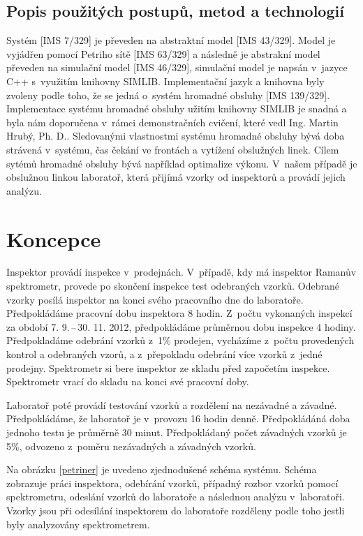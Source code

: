 \documentclass[11pt,a4paper]{article}
\begin{document}
\subsection{Popis použitých postupů, metod a technologií}
Systém [IMS 7/329] je převeden na abstraktní model [IMS 43/329].
Model je vyjádřen pomocí Petriho sítě [IMS 63/329] a následně
je abstrakní model převeden na simulační model [IMS 46/329],
simulační model je napsán v~jazyce C++ s~využitím
knihovny SIMLIB. Implementační jazyk a knihovna byly zvoleny podle
toho, že se jedná o~systém hromadné obsluhy [IMS 139/329]. Implementace
systému hromadné obsluhy užitím knihovny SIMLIB je snadná a byla nám doporučena v~rámci
demonstračních cvičení, které vedl Ing. Martin Hrubý, Ph. D..
Sledovanými vlastnostmi systému hromadné obsluhy bývá doba strávená v~systému, čas čekání ve frontách a 
vytížení obslužných linek. Cílem sytémů hromadné obsluhy bývá například optimalize výkonu. V~našem případě je 
obslužnou linkou laboratoř, která přijímá vzorky od inspektorů a provádí jejich
analýzu.

\section{Koncepce}
Inspektor provádí inspekce v~prodejnách. V~případě, kdy má inspektor
Ramanův spektrometr, provede po skončení inspekce test odebraných
vzorků. Odebrané vzorky posílá inspektor na konci svého pracovního dne 
do laboratoře. Předpokládáme pracovní dobu
inspektora 8 hodin. Z~počtu vykonaných inspekcí za období
7. 9.\,--\,30. 11. 2012, předpokládáme průměrnou dobu inspekce 4 hodiny.
Předpokladáme odebrání vzorků z~1\% prodejen, vycházíme z~počtu
provedených kontrol a odebraných vzorů, a z~přepokladu odebrání
více vzorků z~jedné prodejny. Spektrometr si bere inspektor ze skladu
před započetím inspekce. Spektrometr vrací do skladu na konci své pracovní doby.

Laboratoř poté provádí testování vzorků a rozdělení na nezávadné a závadné.
Předpokládáme, že laboratoř je v~provozu 16 hodin denně.
Předpokládáná doba jednoho testu je průměrně 30 minut. Předpokládaný počet
závadných vzorků je 5\%, odvozeno z~poměru nezávadných a závadných vzorků.

Na obrázku \ref{petriner} je uvedeno zjednodušené schéma systému. Schéma
zobrazuje práci inspektora, odebírání vzorků, případný rozbor vzorků pomocí
spektrometru, odeslání vzorků do laboratoře a následnou analýzu v~laboratoři. 
Vzorky jsou při odesílání inspektorem do laboratoře rozděleny podle toho jestli 
byly analyzovány spektrometrem. 
\end{document}
